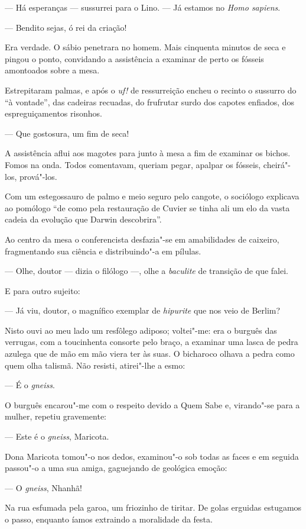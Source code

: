 --- Há esperanças --- sussurrei para o Lino. --- Já estamos no
\emph{Homo sapiens}.

--- Bendito sejas, ó rei da criação!

Era verdade. O sábio penetrara no homem. Mais cinquenta minutos de seca
e pingou o ponto, convidando a assistência a examinar de perto os
fósseis amontoados sobre a mesa.

Estrepitaram palmas, e após o \emph{uf!} de ressurreição encheu o
recinto o sussurro do ``à vontade'', das cadeiras recuadas, do frufrutar
surdo dos capotes enfiados, dos espreguiçamentos risonhos.

--- Que gostosura, um fim de seca!

A assistência aflui aos magotes para junto à mesa a fim de examinar os
bichos. Fomos na onda. Todos comentavam, queriam pegar, apalpar os
fósseis, cheirá"-los, prová"-los.

Com um estegossauro de palmo e meio seguro pelo cangote, o sociólogo
explicava ao pomólogo ``de como pela restauração de Cuvier se tinha ali
um elo da vasta cadeia da evolução que Darwin descobrira''.

Ao centro da mesa o conferencista desfazia"-se em amabilidades de
caixeiro, fragmentando sua ciência e distribuindo"-a em pílulas.

--- Olhe, doutor --- dizia o filólogo ---, olhe a \emph{baculite} de
transição de que falei.

E para outro sujeito:

--- Já viu, doutor, o magnífico exemplar de \emph{hipurite} que nos veio
de Berlim?

Nisto ouvi ao meu lado um resfôlego adiposo; voltei"-me: era o burguês
das verrugas, com a toucinhenta consorte pelo braço, a examinar uma
lasca de pedra azulega que de mão em mão viera ter às suas. O bicharoco
olhava a pedra como quem olha talismã. Não resisti, atirei"-lhe a esmo:

--- É o \emph{gneiss}.

O burguês encarou"-me com o respeito devido a Quem Sabe e, virando"-se
para a mulher, repetiu gravemente:

--- Este é o \emph{gneiss}, Maricota.

Dona Maricota tomou"-o nos dedos, examinou"-o sob todas as faces e em
seguida passou"-o a uma sua amiga, gaguejando de geológica emoção:

--- O \emph{gneiss}, Nhanhã!

Na rua esfumada pela garoa, um friozinho de tiritar. De golas erguidas
estugamos o passo, enquanto íamos extraindo a moralidade da festa.

